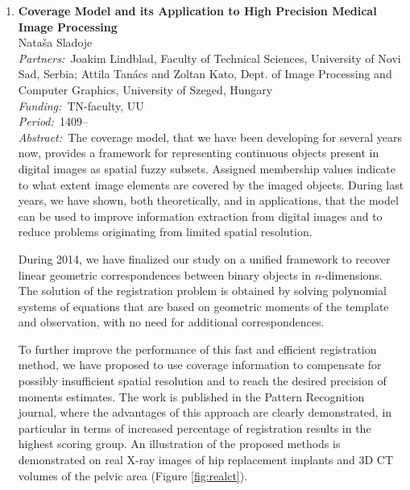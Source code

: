 \documentclass[10pt, a4paper]{article}
\newcommand{\aabstract}[1]{\emph{Abstract:~}#1}
\newcommand{\ffunding}[1]{\emph{Funding:~}#1\\}
\newcommand{\ppartners}[1]{\emph{Partners:~}#1\\}
\newcommand{\pperiod}[1]{\emph{Period:~}#1\\}
\begin{document}
{\begin{enumerate}
{We have presented the results of our study at the International Conference on Image Analysis and Recognition (ICIAR 2014), held in Algarve, Portugal. 
The proceedings of the conference is printed in the Lecture Notes in Computer Science series.}


\item
\textbf{Coverage Model and its Application to High Precision Medical Image Processing}\\
Nata\v sa Sladoje\\
\ppartners{Joakim Lindblad, Faculty of Technical Sciences, University of Novi Sad, Serbia;  Attila Tan\' acs and Zoltan Kato, Dept. of Image Processing and Computer Graphics, University of Szeged, Hungary}
\ffunding{TN-faculty, UU}
\pperiod{1409--}
\aabstract{The coverage model, that we have been developing for several years now,  provides a framework for representing continuous objects present in digital images as spatial fuzzy subsets. Assigned membership values indicate to what extent image elements are covered by the imaged objects.  During last years, we have shown, both theoretically, and in applications, that the model can be used to improve information extraction from digital images and to reduce problems originating from limited spatial resolution. 

During 2014, we have finalized our study on a unified framework to recover linear geometric correspondences between binary objects in $n$-dimensions. The solution of the registration problem is obtained by solving polynomial systems of equations that are based on geometric moments of the template and observation, with no need for additional correspondences. 

To further improve the performance of this fast and efficient registration method, we have proposed to use coverage information to compensate for possibly insufficient spatial resolution and to reach the desired precision of moments estimates. The work is published in the Pattern Recognition journal, where the advantages of this approach are clearly demonstrated, in particular in terms of increased percentage of registration results in the highest scoring group. An illustration of the  proposed methods is demonstrated on real X-ray images of hip replacement implants and 3D CT volumes of the pelvic area (Figure \ref{fig:realct}).} 


\end{enumerate}}
\end{document}
